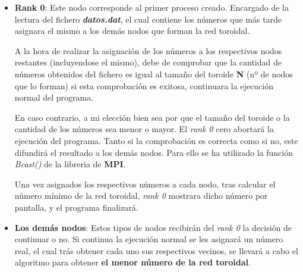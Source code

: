 \documentclass[11pt]{article}
\newif\ifspanish %
\begin{document}
\begin{itemize}
	\item \textbf{Rank 0}: Este nodo corresponde al primer proceso creado. Encargado de la lectura del fichero \textit{\textbf{datos.dat}}, el cual contiene los números que más tarde asignara el mismo a los demás nodos que forman la red toroidal.
	
	A la hora de realizar la asignación de los números a los respectivos nodos restantes (incluyendose el mismo), debe de comprobar que la cantidad de números obtenidos del fichero es igual al tamaño del toroide \textbf{N} (nº de nodos que lo forman) si esta comprobación es exitosa, continuara la ejecución normal del programa.
	
	En caso contrario, a mi elección bien sea por que el tamaño del toroide o la cantidad de los números sea menor o mayor. El \textit{rank 0} cero abortará la ejecución del programa. 
	Tanto si la comprobación es correcta como si no, este difundirá el resultado a los demás nodos. Para ello se ha utilizado la función \textit{Bcast()} de la libreria de \textbf{MPI}.
	
	Una vez asignados los respectivos números a cada nodo, tras calcular el número mínimo de la red toroidal, \textit{rank 0} mostrara dicho número por pantalla, y el programa finalizará.
	
	\item \textbf{Los demás nodos}: Estos tipos de nodos recibirán del \textit{rank 0} la decisión de continuar o no. Si continua la ejecución normal se les asignará un número real, el cual trás obtener cada uno sus respectivos vecinos, se  llevará a cabo el algoritmo para obtener \textbf{el menor número de la red toroidal}.
\end{itemize}



\newpage



\ifspanish
	\addcontentsline{toc}{section}{Referencias}
\else
\fi
\end{document}
